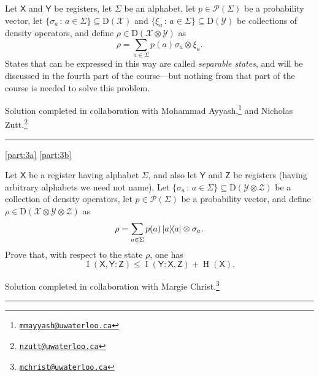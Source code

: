 \documentclass[boxes,pages,color=SeaGreen]{homework}
\newcommand{\collab}[1]{\footnote{\href{mailto:#1}{\texttt{#1}}}}
\newcommand{\tinyspace}{\mspace{1mu}}
\renewcommand{\op}[1]{\operatorname{#1}}
\newcommand{\X}{\mathcal{X}}
\newcommand{\Y}{\mathcal{Y}}
\newcommand{\Z}{\mathcal{Z}}
\renewcommand{\P}{\mathcal{P}}
\newcommand{\reg}[1]{\mathsf{#1}}
\newcommand{\Density}{\mathrm{D}}
\begin{document}

\begin{problem}
Let $\reg{X}$ and $\reg{Y}$ be registers, let $\Sigma$ be an alphabet,
let $p\in\P(\Sigma)$ be a probability vector, let
$\{\sigma_a\,:\,a\in\Sigma\}\subseteq\Density(\X)$ and
$\{\xi_a\,:\,a\in\Sigma\}\subseteq\Density(\Y)$ be collections of density
operators, and define $\rho\in\Density(\X\otimes\Y)$ as
\begin{displaymath}
    \rho = \sum_{a\in\Sigma} p(a)\tinyspace\sigma_a\otimes\xi_a.
\end{displaymath}
States that can be expressed in this way are called \emph{separable states},
and will be discussed in the fourth part of the course---but nothing from
that part of the course is needed to solve this problem.

\end{problem}

\noindent Solution completed in collaboration with Mohammad Ayyash,\collab{mmayyash@uwaterloo.ca} and Nicholas Zutt.\collab{nzutt@uwaterloo.ca}

{\noindent\color{SeaGreen!30}\rule{\textwidth}{1.5pt}}

\begin{solution}
    \ref{part:3a}
    \ref{part:3b}
\end{solution}


\begin{problem}
Let $\reg{X}$ be a register having alphabet $\Sigma$, and also let
$\reg{Y}$ and $\reg{Z}$ be registers (having arbitrary alphabets we need
not name).
Let $\{\sigma_a\,:\,a\in\Sigma\}\subseteq\Density(\Y\otimes\Z)$
be a collection of density operators, let $p\in\P(\Sigma)$ be a probability
vector, and define $\rho\in\Density(\X\otimes\Y\otimes\Z)$ as
\[
    \rho = \sum_{a\in\Sigma} p(a) \ketbra{a} \otimes \sigma_a.
\]
Prove that, with respect to the state $\rho$, one has
\[
    \op{I}(\reg{X},\reg{Y} : \reg{Z})
    \leq \op{I}(\reg{Y}:\reg{X},\reg{Z}) + \op{H}(\reg{X}).
\]
\end{problem}

\noindent Solution completed in collaboration with Margie Christ.\collab{mchrist@uwaterloo.ca}

{\noindent\color{SeaGreen!30}\rule{\textwidth}{1.5pt}}
\end{document}

